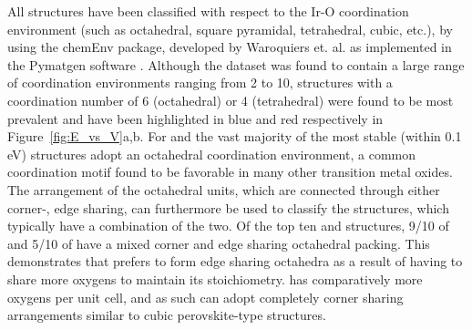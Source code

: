 %
All structures have been classified with respect to the Ir-O coordination environment (such as octahedral, square pyramidal, tetrahedral, cubic, etc.),
by using the chemEnv package, developed by Waroquiers et. al. \cite{Waroquiers2017} as implemented in the Pymatgen software \cite{Ong2013}.
%
Although the dataset was found to contain a large range of coordination environments ranging from 2 to 10,
structures with a coordination number of 6 (octahedral) or 4 (tetrahedral) were found to be most prevalent and have been highlighted in blue and red respectively in Figure~\ref{fig:E_vs_V}a,b.
%
For \IrOtwo and \IrOthree the vast majority of the most stable (within 0.1 eV) structures adopt an octahedral coordination environment,
a common coordination motif found to be favorable in many other transition metal oxides.\cite{Waroquiers2017}
%
The arrangement of the octahedral units, which are connected through either corner-, edge sharing,
can furthermore be used to classify the structures,
which typically have a combination of the two.
%
Of the top ten \IrOtwo and \IrOthree structures, 9/10 of \IrOtwo and 5/10 of \IrOthree have a mixed corner and edge sharing octahedral packing.
%
This demonstrates that \IrOtwo prefers to form edge sharing octahedra as a result of having to share more oxygens to maintain its stoichiometry.
%
\IrOthree has comparatively more oxygens per unit cell, and as such can adopt completely corner sharing arrangements similar to cubic perovskite-type structures.


